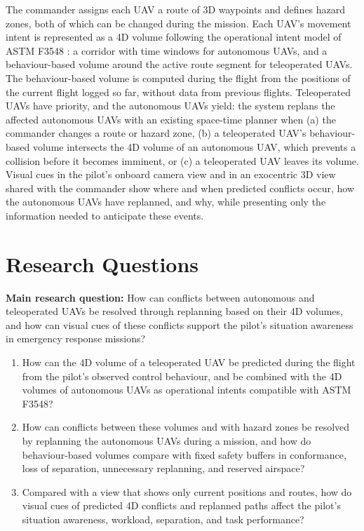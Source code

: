 \documentclass{article}
\begin{document}
The commander assigns each UAV a route of 3D waypoints and defines hazard zones, both of which can be changed during the mission.
Each UAV's movement intent is represented as a 4D volume following the operational intent model of ASTM F3548 \cite{astmf3548}: a corridor with time windows for autonomous UAVs, and a behaviour-based volume around the active route segment for teleoperated UAVs.
The behaviour-based volume is computed during the flight from the positions of the current flight logged so far, without data from previous flights.
Teleoperated UAVs have priority, and the autonomous UAVs yield: the system replans the affected autonomous UAVs with an existing space-time planner \cite{silver2005} when (a) the commander changes a route or hazard zone, (b) a teleoperated UAV's behaviour-based volume intersects the 4D volume of an autonomous UAV, which prevents a collision before it becomes imminent, or (c) a teleoperated UAV leaves its volume.
Visual cues in the pilot's onboard camera view and in an exocentric 3D view shared with the commander show where and when predicted conflicts occur, how the autonomous UAVs have replanned, and why, while presenting only the information needed to anticipate these events.

\section{Research Questions}
\textbf{Main research question:} How can conflicts between autonomous and teleoperated UAVs be resolved through replanning based on their 4D volumes, and how can visual cues of these conflicts support the pilot's situation awareness in emergency response missions?

\begin{enumerate}[label=\textbf{RQ\arabic*}]
  \item How can the 4D volume of a teleoperated UAV be predicted during the flight from the pilot's observed control behaviour, and be combined with the 4D volumes of autonomous UAVs as operational intents compatible with ASTM F3548?
  \item How can conflicts between these volumes and with hazard zones be resolved by replanning the autonomous UAVs during a mission, and how do behaviour-based volumes compare with fixed safety buffers in conformance, loss of separation, unnecessary replanning, and reserved airspace?
  \item Compared with a view that shows only current positions and routes, how do visual cues of predicted 4D conflicts and replanned paths affect the pilot's situation awareness, workload, separation, and task performance?
\end{enumerate}
\end{document}
